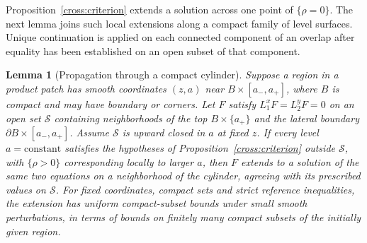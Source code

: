 \documentclass[11pt,a4paper]{article}
\newtheorem{lemma}[theorem]{Lemma}
\theoremstyle{definition}
\theoremstyle{remark}
\numberwithin{equation}{section}
\begin{document}
Proposition~\ref{cross:criterion} extends a solution across one point
of $\{\rho=0\}$. The next lemma joins such local extensions along
a compact family of level surfaces. Unique continuation is applied
on each connected component of an overlap after equality has been
established on an open subset of that component.

\begin{lemma}[Propagation through a compact cylinder]
\label{cross:propagation}
Suppose a region in a product patch has smooth coordinates $(z,a)$
near $B\times[a_-,a_+]$, where $B$ is compact and may have boundary
or corners. Let $F$ satisfy $L_1^xF=L_2^yF=0$ on an open set
$\mathcal S$ containing neighborhoods of the top
$B\times\{a_+\}$ and the lateral boundary
$\partial B\times[a_-,a_+]$. Assume $\mathcal S$ is upward closed
in $a$ at fixed $z$. If every level $a=\mathrm{constant}$ satisfies
the hypotheses of Proposition~\ref{cross:criterion} outside
$\mathcal S$, with $\{\rho>0\}$ corresponding locally to larger
$a$, then $F$ extends to a solution of the same two equations on
a neighborhood of the cylinder, agreeing with its prescribed values
on $\mathcal S$.
For fixed coordinates, compact sets and strict reference inequalities,
the extension has uniform compact-subset bounds under small smooth
perturbations, in terms of bounds on finitely many compact subsets of
the initially given region.
\end{lemma}
\end{document}
